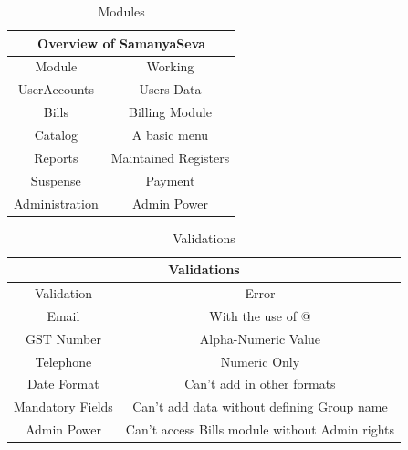 \begin{table}[h]
\centering
\begin{tabular}{ ||c|c|| }
\hline
 \multicolumn{2}{||c||}{Overview of SamanyaSeva} \\
 \hline
 Module & Working \\ [0.5ex] 
 \hline \hline
 UserAccounts & Users Data \\ \hline
  Bills & Billing Module \\ \hline
  Catalog & A basic menu\\ \hline
  Reports & Maintained Registers \\ \hline
  Suspense & Payment \\ \hline
  Administration &  Admin Power \\ \hline
  
\end{tabular}
\caption{Modules}
\label{table2}
\end{table}

\begin{table}[h]
\centering
\begin{tabular}{ ||c|c|| }
\hline
 \multicolumn{2}{||c||}{Validations} \\
 \hline
 Validation & Error \\ [0.5ex] 
 \hline \hline
 Email & With the use of @ \\ \hline
GST Number & Alpha-Numeric Value \\ \hline
 Telephone & Numeric Only\\ \hline
 Date Format & Can't add in other formats \\ \hline
Mandatory Fields & Can't add data without defining Group name \\ \hline
 Admin Power &  Can't access Bills module without Admin rights \\ \hline
  
\end{tabular}
\caption{Validations}
\label{table2}
\end{table}










